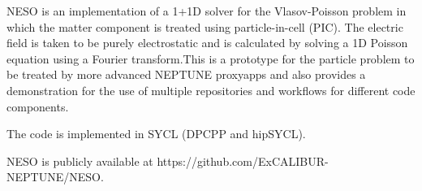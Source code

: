 
NESO is an implementation of a 1+1D solver for the Vlasov-Poisson problem in which the matter component is 
treated using particle-in-cell (PIC).  The electric field is taken to be purely electrostatic and is calculated by 
solving a 1D Poisson equation using a Fourier transform.This is a prototype for the particle problem to be treated by
 more advanced NEPTUNE proxyapps and also provides a demonstration for the use of multiple repositories and workflows
 for different code components.  

The code is implemented in SYCL (DPCPP and hipSYCL).

NESO is publicly available at {https://github.com/ExCALIBUR-NEPTUNE/NESO}. 
